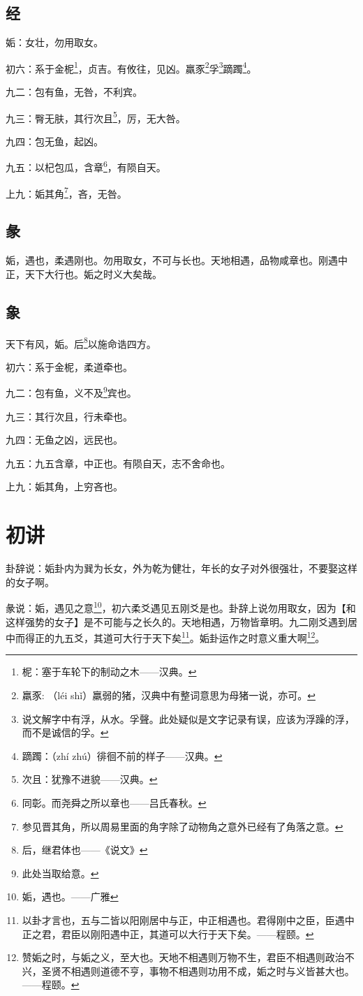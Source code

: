 \documentclass[12pt,oneside]{book}
\begin{document}
\subsection{经}
姤：女壮，勿用取女。

初六：系于金柅\footnote{柅：塞于车轮下的制动之木——汉典。}，贞吉。有攸往，见凶。羸豕\footnote{羸豕: （léi shǐ）羸弱的猪，汉典中有整词意思为母猪一说，亦可。}孚\footnote{说文解字中有浮，从水。孚聲。此处疑似是文字记录有误，应该为浮躁的浮，而不是诚信的孚。}蹢躅\footnote{蹢躅：（zhí zhú）徘徊不前的样子——汉典。}。

九二：包有鱼，无咎，不利宾。

九三：臀无肤，其行次且\footnote{次且：犹豫不进貌——汉典。}，厉，无大咎。

九四：包无鱼，起凶。

九五：以杞包瓜，含章\footnote{同彰。而尧舜之所以章也——吕氏春秋。}，有陨自天。

上九：姤其角\footnote{参见晋其角，所以周易里面的角字除了动物角之意外已经有了角落之意。}，吝，无咎。


\subsection{彖}
姤，遇也，柔遇刚也。勿用取女，不可与长也。天地相遇，品物咸章也。刚遇中正，天下大行也。姤之时义大矣哉。

\subsection{象}
天下有风，姤。后\footnote{后，继君体也——《说文》}以施命诰四方。

初六：系于金柅，柔道牵也。

九二：包有鱼，义不及\footnote{此处当取给意。}宾也。

九三：其行次且，行未牵也。

九四：无鱼之凶，远民也。

九五：九五含章，中正也。有陨自天，志不舍命也。

上九：姤其角，上穷吝也。


\section{初讲}
卦辞说：姤卦内为巽为长女，外为乾为健壮，年长的女子对外很强壮，不要娶这样的女子啊。

彖说：姤，遇见之意\footnote{姤，遇也。——广雅}，初六柔爻遇见五刚爻是也。卦辞上说勿用取女，因为【和这样强势的女子】是不可能与之长久的。天地相遇，万物皆章明。九二刚爻遇到居中而得正的九五爻，其道可大行于天下矣\footnote{以卦才言也，五与二皆以阳刚居中与正，中正相遇也。君得刚中之臣，臣遇中正之君，君臣以刚阳遇中正，其道可以大行于天下矣。——程颐。}。姤卦运作之时意义重大啊\footnote{赞姤之时，与姤之义，至大也。天地不相遇则万物不生，君臣不相遇则政治不兴，圣贤不相遇则道德不亨，事物不相遇则功用不成，姤之时与义皆甚大也。——程颐。}。
\end{document}
